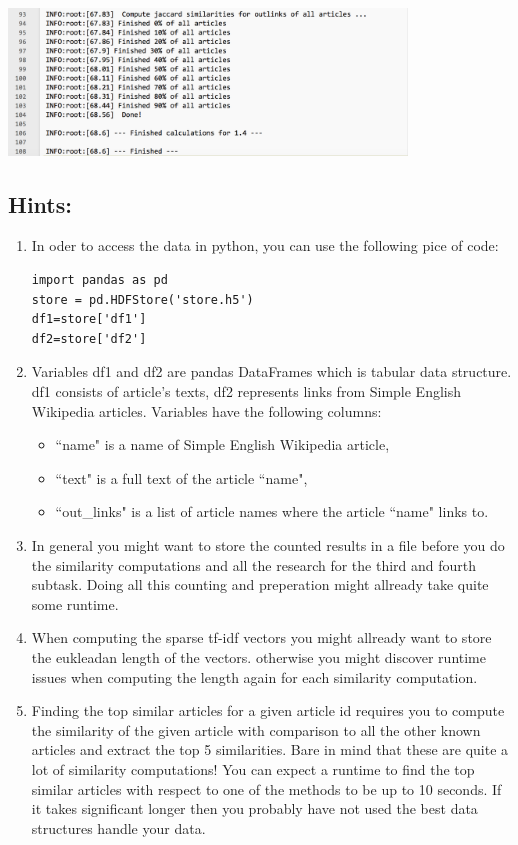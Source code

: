 \documentclass{WeSTassignment}
\begin{document}
\includegraphics[width=400px]{log_03}


\subsection{Hints:}
\begin{enumerate}
\item In oder to access the data in python, you can use the following pice of code:
\begin{verbatim} 
import pandas as pd
store = pd.HDFStore('store.h5')
df1=store['df1'] 
df2=store['df2'] 
\end{verbatim}
\item Variables df1 and df2 are pandas DataFrames which is tabular data structure. df1 consists of article's texts, df2 represents links from Simple English Wikipedia articles. Variables have the following columns:
\begin{itemize}
\item ``name" is a name of Simple English Wikipedia article,
\item ``text" is a full text of the article ``name",
\item ``out\_links" is a list of article names where the article ``name" links to.
\end{itemize}
\item In general you might want to store the counted results in a file before you do the similarity computations and all the research for the third and fourth subtask. Doing all this counting and preperation might allready take quite some runtime. 
\item When computing the sparse tf-idf vectors you might allready want to store the eukleadan length of the vectors. otherwise you might discover runtime issues when computing the length again for each similarity computation. 
\item Finding the top similar articles for a given article id requires you to compute the similarity of the given article with comparison to all the other known articles and extract the top 5 similarities. Bare in mind that these are quite a lot of similarity computations! You can expect a runtime to find the top similar articles with respect to one of the methods to be up to 10 seconds. If it takes significant longer then you probably have not used the best data structures handle your data.

\end{enumerate}
\end{document}
